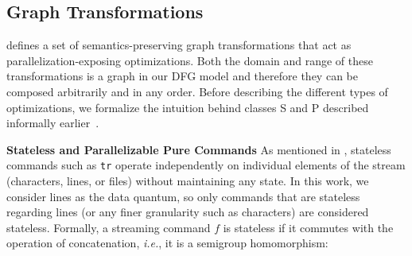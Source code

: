 \documentclass[letterpaper,twocolumn,10pt]{article}
\newcommand{\eg}{{\em e.g.}, }
\newcommand{\ie}{{\em i.e.}, }
\newcommand{\heading}[1]{\vspace{4pt}\noindent\textbf{#1}\enspace}
\newcommand{\ttt}[1]{\texttt{#1}}
\newcommand{\cn}[1]{\mbox{\textcircled{\footnotesize #1}}}
\newcommand{\sta}{\cn{\textsc{S}}\xspace}
\newcommand{\pur}{\cn{\textsc{P}}\xspace}
\newcommand{\todo}[1]{\hl{#1}\xspace}
\newcommand{\nv}[1]{[{\color{cyan}nv: #1}]}
\newcommand{\kk}[1]{[{\color{magenta}kk: #1}]}
\newcommand{\km}[1]{[{\color{blue}km: #1}]}
\begin{document}
\subsection{Graph Transformations}
\label{ir:transformations}


\sys defines a set of semantics-preserving graph transformations
that act as parallelization-exposing optimizations. Both the domain
and range of these transformations is a graph in our DFG model
and therefore they can be composed arbitrarily and in any order.
Before describing the different types of optimizations, we formalize
the intuition behind classes \sta and \pur described informally
earlier~.




\heading{Stateless and Parallelizable Pure Commands}
As mentioned in , stateless commands such as \ttt{tr}
operate independently on individual elements of the stream
(characters, lines, or files) without maintaining any state. In this
work, we consider lines as the data quantum, so only commands that are
stateless regarding lines (or any finer granularity such as
characters) are considered stateless. Formally, a
streaming command $f$ is stateless if it commutes with
the operation of concatenation, \ie it is a semigroup homomorphism:
\end{document}
